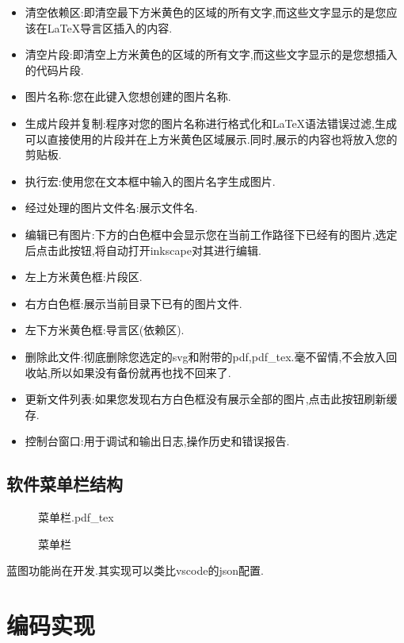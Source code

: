 \documentclass[AutoFakeBold,letterpaper,12pt,hidelinks]{article}
\newcommand{\incfig}[1]{%
    \def\svgwidth{\columnwidth}
    {#1.pdf_tex}
}
\begin{document}
\begin{itemize}
	\item 清空依赖区:即清空最下方米黄色的区域的所有文字,而这些文字显示的是您应该在\LaTeX{}导言区插入的内容.
	\item  清空片段:即清空上方米黄色的区域的所有文字,而这些文字显示的是您想插入的代码片段.

	\item 图片名称:您在此键入您想创建的图片名称.
	\item  生成片段并复制:程序对您的图片名称进行格式化和\LaTeX{}语法错误过滤,生成可以直接使用的片段并在上方米黄色区域展示.同时,展示的内容也将放入您的剪贴板.

	\item  执行宏:使用您在文本框中输入的图片名字生成图片.

	\item 经过处理的图片文件名:展示文件名.

	\item  编辑已有图片:下方的白色框中会显示您在当前工作路径下已经有的图片,选定后点击此按钮,将自动打开inkscape对其进行编辑.

	\item 左上方米黄色框:片段区.

	\item  右方白色框:展示当前目录下已有的图片文件.

	\item  左下方米黄色框:导言区(依赖区).
	\item 删除此文件:彻底删除您选定的svg和附带的pdf,pdf\_tex.毫不留情,不会放入回收站,所以如果没有备份就再也找不回来了.

	\item 更新文件列表:如果您发现右方白色框没有展示全部的图片,点击此按钮刷新缓存.

	\item 控制台窗口:用于调试和输出日志,操作历史和错误报告.
\end{itemize}
\subsection{软件菜单栏结构}%

\begin{figure}[H]
    \centering
    \incfig{菜单栏}
    \caption{菜单栏}
    \label{fig:菜单栏}
\end{figure}
蓝图功能尚在开发.其实现可以类比vscode的json配置.
\section{编码实现}%
\end{document}
